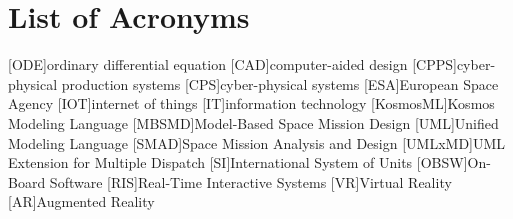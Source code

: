 \chapter*{List of Acronyms}
\begin{acronym}
    [ODE]{ordinary differential equation}
    [CAD]{computer-aided design}
    [CPPS]{cyber-physical production systems}
    [CPS]{cyber-physical systems}
    [ESA]{European Space Agency}
    [IOT]{internet of things}
    [IT]{information technology}
    [KosmosML]{Kosmos Modeling Language}
    [MBSMD]{Model-Based Space Mission Design}
    [UML]{Unified Modeling Language}
    [SMAD]{Space Mission Analysis and Design}
    [UMLxMD]{UML Extension for Multiple Dispatch}
    [SI]{International System of Units }
    [OBSW]{On-Board Software}
    [RIS]{Real-Time Interactive Systems}
    [VR]{Virtual Reality}
    [AR]{Augmented Reality}
\end{acronym}
